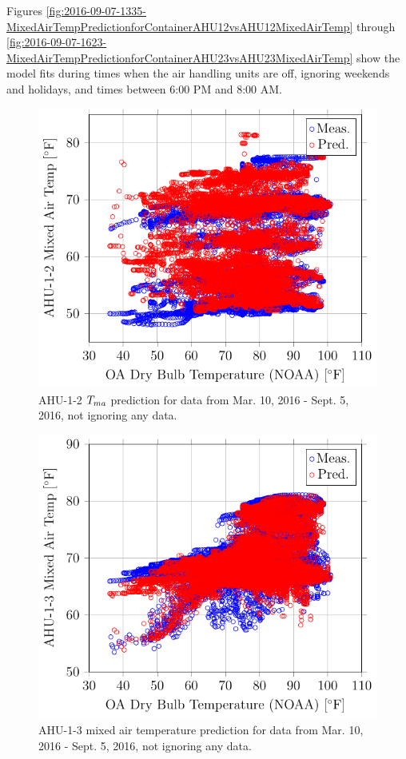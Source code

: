 Figures
\ref{fig:2016-09-07-1335-MixedAirTempPredictionforContainerAHU12vsAHU12MixedAirTemp}
through
\ref{fig:2016-09-07-1623-MixedAirTempPredictionforContainerAHU23vsAHU23MixedAirTemp}
show the model fits during times when the air handling units are off, ignoring
weekends and holidays, and times between 6:00 PM and 8:00 AM.

\newcommand{\matcaption}[1]{#1 \(\mat\) prediction for data from Mar. 10, 2016 - Sept. 5, 2016, not ignoring any data.}

\begin{figure}
\centering
\includegraphics[]{Plots/2016-09-07-1218-AHU12MixedAirTempvsOADryBulbTemperatureNOAA.pdf}
\caption{\matcaption{AHU-1-2}}
\label{fig:2016-09-07-1218-AHU12MixedAirTempvsOADryBulbTemperatureNOAA}
\end{figure}

\begin{figure}
\centering
\includegraphics[]{Plots/2016-09-07-0943-AHU13MixedAirTempvsOADryBulbTemperatureNOAA.pdf}
\caption{AHU-1-3 mixed air temperature prediction for data from Mar. 10, 2016 - Sept. 5, 2016, not ignoring any data.}
\label{fig:AHU13MixedAirTempvsOADryBulbTemperatureNOAA-2}
\end{figure}



